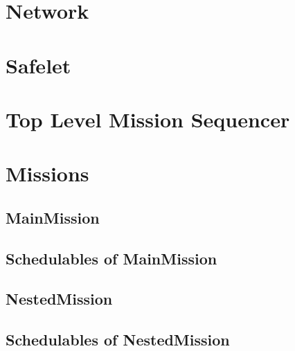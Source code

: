 \documentclass[10pt,a4paper]{article}
\begin{document}
\section{Network}

\newpage

\section{Safelet}

\newpage

\section{Top Level Mission Sequencer}

\newpage

\section{Missions}


\subsection{MainMission}

\newpage

\subsection{Schedulables of MainMission}




\subsection{NestedMission}

\newpage

\subsection{Schedulables of NestedMission}


\end{document}
